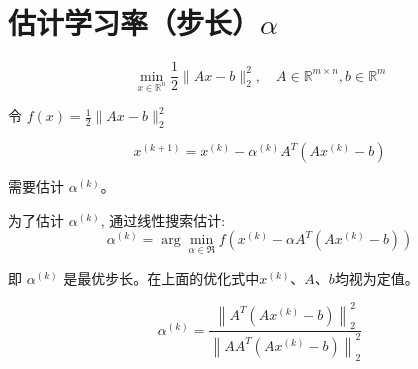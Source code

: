 \section{估计学习率（步长）$\alpha$}

\begin{problem}
    $$
    \min _{x \in \mathbb{R}^{n}} \frac{1}{2}\|A x-b\|_{2}^{2}, \quad A \in \mathbb{R}^{m \times n}, b \in \mathbb{R}^{m}
    $$
    
    令 $ f(x)=\frac{1}{2}\|A x-b\|_{2}^{2} $

    $$ x^{(k+1)}=x^{(k)}-\alpha^{(k)} A^{T}\left(A x^{(k)}-b\right) $$

    需要估计 $ \alpha^{(k)} $。
\end{problem}

为了估计 $ \alpha^{(k)} $, 通过线性搜索估计:
$$
\alpha^{(k)}=\arg \min _{\alpha \in \Re} f\left(x^{(k)}-\alpha A^{T}\left(A x^{(k)}-b\right)\right)
$$

即 $ \alpha^{(k)} $ 是最优步长。在上面的优化式中$x^{(k)}$、$A$、$b$均视为定值。

\begin{theorem}[线性搜索估计的最优步长]
    $$\alpha^{(k)}=\frac{\left\|A^{T}\left(A x^{(k)}-b\right)\right\|_{2}^{2}}{\left\|A A^{T}\left(A x^{(k)}-b\right)\right\|_{2}^{2}}$$
\end{theorem}

